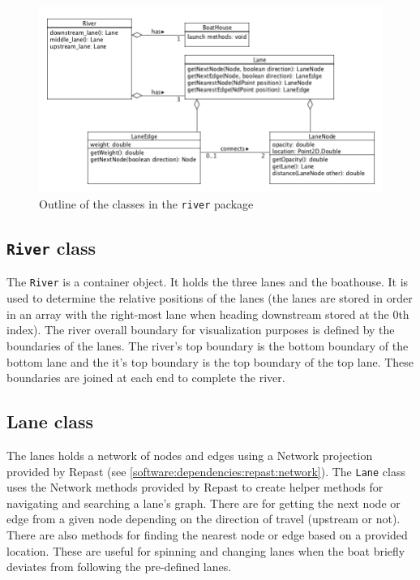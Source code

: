 \begin{figure}
\begin{center}
  \includegraphics[scale=0.3]{images/riverpackage.png}
  \caption{Outline of the classes in the \texttt{river} package}
  \label{software:fig:riverUML}
\end{center}
\end{figure}

\subsection{\texttt{River} class}
The \texttt{River} is a container object. It holds the three lanes and the
boathouse. It is used to determine the relative positions of the lanes
(the lanes are stored in order in an array with the right-most lane when
heading downstream stored at the 0th index). The river overall
boundary for visualization purposes is defined by the boundaries of
the lanes. The river's top boundary is the bottom boundary of
the bottom lane and the it's top boundary is the top boundary
of the top lane. These boundaries are joined at each end to
complete the river.

\subsection{Lane class}

The lanes holds a network of nodes and edges using a Network
projection provided by Repast (see
\ref{software:dependencies:repast:network}). The \texttt{Lane} class uses the
Network methods provided by Repast to create helper methods for
navigating and searching a lane's graph. There are for getting the
next node or edge from a given node depending on the direction of
travel (upstream or not). There are also methods for finding the
nearest node or edge based on a provided location. These are useful
for spinning and changing lanes when the boat briefly deviates from
following the pre-defined lanes.

